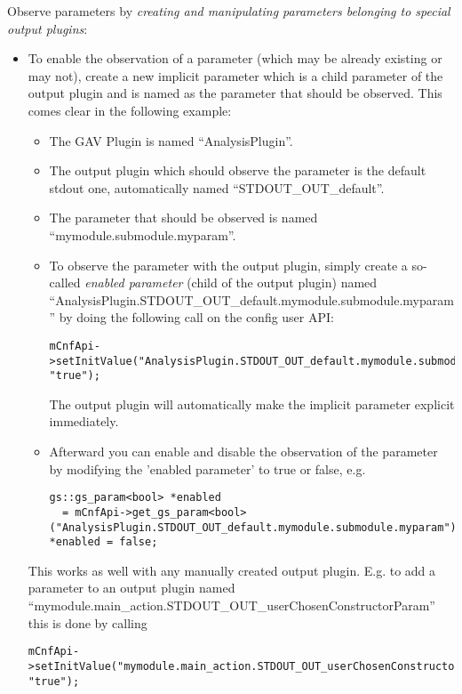 Observe parameters by {\em creating and manipulating parameters belonging to special output plugins}:
\begin{itemize}
  \item To enable the observation of a parameter (which may be already existing or may not), create a new implicit parameter which is a child parameter of the output plugin and is named as the parameter that should be observed. This comes clear in the following example:
	\begin{itemize}
  		\item The GAV Plugin is named ``{\sffamily AnalysisPlugin}''.
  		\item The output plugin which should observe the parameter is the default stdout one, automatically named \mbox{``{\sffamily STDOUT\_OUT\_default}''}.
		\item The parameter that should be observed is named ``{\sffamily mymodule.submodule.myparam}''.
		\item To observe the parameter with the output plugin, simply create a so-called {\em enabled parameter} (child of the output plugin) named \mbox{``{\sffamily AnalysisPlugin.STDOUT\_OUT\_default.mymodule.submodule.myparam}''} by doing the following call on the config user API:  
		\begin{lstlisting}
mCnfApi->setInitValue("AnalysisPlugin.STDOUT_OUT_default.mymodule.submodule.myparam", "true");
		\end{lstlisting}
		The output plugin will automatically make the implicit parameter explicit immediately.
		\item Afterward you can enable and disable the observation of the parameter by modifying the 'enabled parameter' to true or false, e.g. 
		\begin{lstlisting}
gs::gs_param<bool> *enabled
  = mCnfApi->get_gs_param<bool>("AnalysisPlugin.STDOUT_OUT_default.mymodule.submodule.myparam");
*enabled = false;
		\end{lstlisting}
	\end{itemize}

This works as well with any manually created output plugin. E.g. to add a parameter to an output plugin named \mbox{``{\sffamily mymodule.main\_action.STDOUT\_OUT\_userChosenConstructorParam}''} this is done by calling
		\begin{lstlisting}
mCnfApi->setInitValue("mymodule.main_action.STDOUT_OUT_userChosenConstructorParam.mymodule.param2", "true");
		\end{lstlisting}

\end{itemize}


